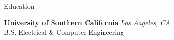 \documentclass[
	10pt, %
]{tex/resume} %
\begin{document}

\begin{rSection}{Education}
	
	\textbf{University of Southern California} \hfill \textit{Los Angeles, CA} \\ 
	B.S. Electrical \& Computer Engineering \hfill \textit{}
	
\end{rSection}

\end{document}
